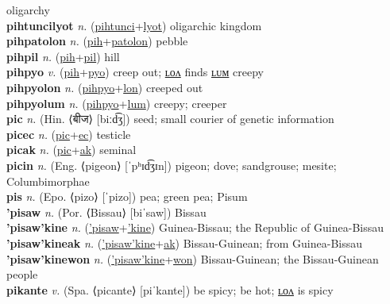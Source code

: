 oligarchy \label{pihtuncilum} \\
\textbf{pihtuncilyot} \textit{n.} (\hyperref[pihtunci]{pihtunci}+\hyperref[lyot]{lyot})
oligarchic kingdom \label{pihtuncilyot} \\
\textbf{pihpatolon} \textit{n.} (\hyperref[pih]{pih}+\hyperref[patolon]{patolon})
pebble \label{pihpatolon} \\
\textbf{pihpil} \textit{n.} (\hyperref[pih]{pih}+\hyperref[pil]{pil})
hill \label{pihpil} \\
\textbf{pihpyo} \textit{v.} (\hyperref[pih]{pih}+\hyperref[pyo]{pyo})
creep out; \hyperref[pihpyolon]{ʟᴏᴧ} finds \hyperref[pihpyolum]{ʟᴜᴍ} creepy \label{pihpyo} \\
\textbf{pihpyolon} \textit{n.} (\hyperref[pihpyo]{pihpyo}+\hyperref[lon]{lon})
creeped out \label{pihpyolon} \\
\textbf{pihpyolum} \textit{n.} (\hyperref[pihpyo]{pihpyo}+\hyperref[lum]{lum})
creepy; creeper \label{pihpyolum} \\
\textbf{pic} \textit{n.} (Hin. ⟨बीज⟩ [biːd͡ʒ])
seed; small courier of genetic information \label{pic} \\
\textbf{picec} \textit{n.} (\hyperref[pic]{pic}+\hyperref[ec]{ec})
testicle \label{picec} \\
\textbf{picak} \textit{n.} (\hyperref[pic]{pic}+\hyperref[ak]{ak})
seminal \label{picak} \\
\textbf{picin} \textit{n.} (Eng. ⟨pigeon⟩ [ˈpʰɪd͡ʒɪn])
pigeon; dove; sandgrouse; mesite; Columbimorphae \label{picin} \\
\textbf{pis} \textit{n.} (Epo. ⟨pizo⟩ [ˈpizo])
pea; green pea; Pisum \label{pis} \\
\textbf{'pisaw} \textit{n.} (Por. ⟨Bissau⟩ [biˈsaw])
Bissau \label{'pisaw} \\
\textbf{'pisaw'kine} \textit{n.} (\hyperref['pisaw]{'pisaw}+\hyperref['kine]{'kine})
Guinea-Bissau; the Republic of Guinea-Bissau \label{'pisaw'kine} \\
\textbf{'pisaw'kineak} \textit{n.} (\hyperref['pisaw'kine]{'pisaw'kine}+\hyperref[ak]{ak})
Bissau-Guinean; from Guinea-Bissau \label{'pisaw'kineak} \\
\textbf{'pisaw'kinewon} \textit{n.} (\hyperref['pisaw'kine]{'pisaw'kine}+\hyperref[won]{won})
Bissau-Guinean; the Bissau-Guinean people \label{'pisaw'kinewon} \\
\textbf{pikante} \textit{v.} (Spa. ⟨picante⟩ [piˈkante])
be spicy; be hot; \hyperref[pikantelon]{ʟᴏᴧ} is spicy \label{pikante} \\
